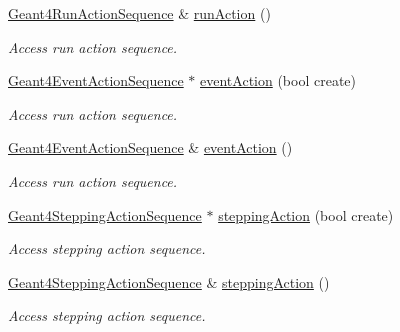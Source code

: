 \begin{DoxyCompactItemize}
\hyperlink{class_d_d4hep_1_1_simulation_1_1_geant4_run_action_sequence}{Geant4RunActionSequence} \& \hyperlink{class_d_d4hep_1_1_simulation_1_1_geant4_action_container_adff65baf436f870b8cc2e9ffd8844e7a}{runAction} ()
\begin{DoxyCompactList}\small\item\em Access run action sequence. \item\end{DoxyCompactList}\item 
\hyperlink{class_d_d4hep_1_1_simulation_1_1_geant4_event_action_sequence}{Geant4EventActionSequence} $\ast$ \hyperlink{class_d_d4hep_1_1_simulation_1_1_geant4_action_container_ab195f38387e12afbfcaccee77ec67845}{eventAction} (bool create)
\begin{DoxyCompactList}\small\item\em Access run action sequence. \item\end{DoxyCompactList}\item 
\hyperlink{class_d_d4hep_1_1_simulation_1_1_geant4_event_action_sequence}{Geant4EventActionSequence} \& \hyperlink{class_d_d4hep_1_1_simulation_1_1_geant4_action_container_a50aa73045e0959041a1ae5c162ab840d}{eventAction} ()
\begin{DoxyCompactList}\small\item\em Access run action sequence. \item\end{DoxyCompactList}\item 
\hyperlink{class_d_d4hep_1_1_simulation_1_1_geant4_stepping_action_sequence}{Geant4SteppingActionSequence} $\ast$ \hyperlink{class_d_d4hep_1_1_simulation_1_1_geant4_action_container_a75a0fa686f783e175eedbd57ed3abbdc}{steppingAction} (bool create)
\begin{DoxyCompactList}\small\item\em Access stepping action sequence. \item\end{DoxyCompactList}\item 
\hyperlink{class_d_d4hep_1_1_simulation_1_1_geant4_stepping_action_sequence}{Geant4SteppingActionSequence} \& \hyperlink{class_d_d4hep_1_1_simulation_1_1_geant4_action_container_aa9fd5d34c9a076788e24abd8906f6e3a}{steppingAction} ()
\begin{DoxyCompactList}\small\item\em Access stepping action sequence. \item\end{DoxyCompactList}\item 

\end{DoxyCompactItemize}

